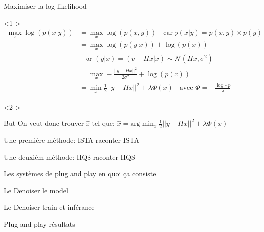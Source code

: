 \documentclass[11pt]{beamer}
\begin{document}
\begin{frame}{Maximiser la log likelihood}
    \begin{visibleenv}<1->
        \begin{align*}
            \max_x \log(p(x|y)) &= \max_x \log(p(x, y)) \quad \text{car } p(x|y) = p(x, y) \times p(y) \\
            &= \max_x \log(p(y|x)) + \log(p(x)) \\
            &\quad \text{or } (y|x) = (v+Hx|x) \sim \mathcal{N}(Hx, \sigma^2) \\
            &= \max_x -\frac{||y-Hx||^2}{2 \sigma^2} + \log(p(x)) \\
            &= \min_x \frac{1}{2}||y-Hx||^2 + \lambda \Phi(x) \quad \text{avec } \Phi = -\frac{\log \circ p}{\lambda}
        \end{align*}
    \end{visibleenv}

    \begin{visibleenv}<2->
        \begin{alertblock}{But}
            On veut donc trouver $\hat{x}$ tel que: $\hat{x} = \text{arg} \min_x \frac{1}{2}||y-Hx||^2 + \lambda \Phi(x)$
        \end{alertblock}
    \end{visibleenv}
\end{frame}

\begin{frame}{Une première méthode: ISTA}
    raconter ISTA
\end{frame}

\begin{frame}{Une deuxièm méthode: HQS}
    raconter HQS
\end{frame}

\begin{frame}{Les systèmes de plug and play}
    en quoi ça consiste
\end{frame}

\begin{frame}{Le Denoiser}
    le model
\end{frame}

\begin{frame}{Le Denoiser}
    train et inférance
\end{frame}

\begin{frame}{Plug and play}
    résultats
\end{frame}
\end{document}
